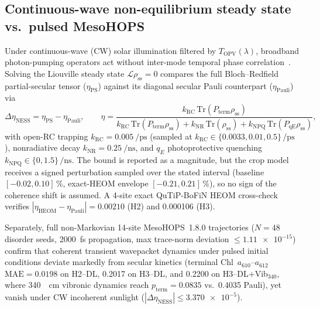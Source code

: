 \documentclass[preprint,12pt,a4paper]{elsarticle}
\begin{document}
\subsection{Continuous-wave non-equilibrium steady state vs.\ pulsed MesoHOPS}
Under continuous-wave (CW) solar illumination filtered by $T_{\mathrm{OPV}}(\lambda)$, broadband photon-pumping operators act without inter-mode temporal phase correlation~\cite{BrumerShapiro2012,Kassal2013}. Solving the Liouville steady state $\mathcal{L}\rho_{\mathrm{ss}} = 0$ compares the full Bloch--Redfield partial-secular tensor ($\eta_{\mathrm{PS}}$) against its diagonal secular Pauli counterpart ($\eta_{\mathrm{Pauli}}$) via
\begin{equation}
 \Delta\eta_{\mathrm{NESS}} = \eta_{\mathrm{PS}} - \eta_{\mathrm{Pauli}}, \qquad
 \eta = \frac{k_{\mathrm{RC}}\,\mathrm{Tr}(P_{\mathrm{term}}\rho_{\mathrm{ss}})}{k_{\mathrm{RC}}\,\mathrm{Tr}(P_{\mathrm{term}}\rho_{\mathrm{ss}}) + k_{\mathrm{NR}}\,\mathrm{Tr}(\rho_{\mathrm{ss}}) + k_{\mathrm{NPQ}}\,\mathrm{Tr}(P_{\mathrm{qE}}\rho_{\mathrm{ss}})},
 \label{eq:ness_eta}
\end{equation}
with open-RC trapping $k_{\mathrm{RC}} = \qty{0.005}{\per\pico\second}$ (sampled at $k_{\mathrm{RC}} \in \{\num{0.0033}, \num{0.01}, \num{0.5}\}\,\unit{\per\pico\second}$), nonradiative decay $k_{\mathrm{NR}} = \qty{0.25}{\per\nano\second}$, and $q_E$ photoprotective quenching $k_{\mathrm{NPQ}} \in \{\num{0}, \num{1.5}\}\,\unit{\per\nano\second}$. The bound is reported as a magnitude, but the crop model receives a signed perturbation sampled over the stated interval (baseline $[\num{-0.02},\num{+0.10}]\,\unit{\percent}$, exact-HEOM envelope $[\num{-0.21},\num{+0.21}]\,\unit{\percent}$), so no sign of the coherence shift is assumed. A 4-site exact QuTiP-BoFiN HEOM cross-check~\cite{Lambert2023} verifies $|\eta_{\mathrm{HEOM}}-\eta_{\mathrm{Pauli}}| = \num{0.00210}$ (H2) and \num{0.000106} (H3).

Separately, full non-Markovian 14-site MesoHOPS~1.8.0 trajectories ($N=48$ disorder seeds, \qty{2000}{\femto\second} propagation, max trace-norm deviation $\le \num{1.11e-15}$) confirm that coherent transient wavepacket dynamics under pulsed initial conditions deviate markedly from secular kinetics (terminal Chl~$a_{610}$--$a_{612}$ $\mathrm{MAE} = \num{0.0198}$ on H2--DL, \num{0.2017} on H3--DL, and \num{0.2200} on H3--DL+Vib$_{340}$, where \qty{340}{\per\centi\meter} vibronic dynamics reach $p_{\mathrm{term}} = \num{0.0835}$ vs.\ \num{0.4035} Pauli), yet vanish under CW incoherent sunlight ($|\Delta\eta_{\mathrm{NESS}}| \le \num{3.370e-5}$).
\end{document}
